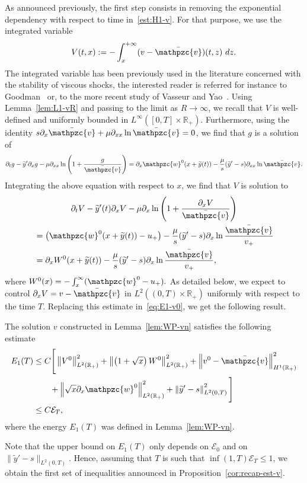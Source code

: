 \documentclass[AHL,Unicode,longabstracts,published]{cedram}
\newcommand{\R}{\mathbb{R}}
\newcommand{\p}{\partial}
\newcommand{\bv}{\bar{\mathpzc{v}}}
\newcommand{\cE}{\mathcal E}
\newcommand{\tw}{\mathpzc{w}}
\newcommand{\ty}{\widetilde{y}}
\begin{document}
As announced previously, the first step consists in removing the exponential dependency with respect to time in~\eqref{est:H1-v}. For that purpose, we use the integrated variable
\begin{equation}\label{df:V}
V(t,x) := -\int_x^{+\infty} (v - \bv)(t,z) \ dz.
\end{equation}
{The integrated variable has been previously used in the literature concerned with the stability of viscous shocks, the interested reader is referred for instance to Goodman~\cite{goodman1986} or, to the more recent study of Vasseur and Yao~\cite{vasseur2016}.} Using Lemma~\ref{lem:L1-vR} and passing to the limit as $R\to \infty$, we recall that $V$ is well-defined and uniformly bounded in $L^\infty([0,T]\times \R_+)$. Furthermore, using the identity $s\p_x \bv + \mu \p_{xx} \ln \bv=0 $, we find that $g$ is a solution of
\begin{equation}\label{eq:g}
\p_t g - \ty'\p_x g -\mu \p_{xx}\ln \left(1 + \frac{g}{\bv}\right)=\p_x \tw^0(x+\ty(t)) - \frac{\mu}{s}(\ty'-s)\p_{xx}\ln \bv.
\end{equation}
Integrating the above equation with respect to $x$, we find that $V$ is solution to
\begin{multline}\label{eq:V}
\partial_t V - \ty'(t) \partial_x V - \mu \partial_x \ln \left(1 + \dfrac{\partial_x V}{\bv} \right)\\
\begin{aligned}
& = \big(\tw^0(x + \ty(t)) - u_+ \big) - \dfrac{\mu}{s}(\ty'-s)\partial_x \ln \dfrac{\bv}{v_+}\\
&=\p_x W^0(x+\ty(t))- \dfrac{\mu}{s} (\ty'-s)\partial_x \ln \dfrac{\bv}{v_+},
\end{aligned}
\end{multline}
where $W^0(x)=-\int_x^\infty (\tw^0 - u_+).$ As detailed below, we expect to control $\partial_x V=v-\bv$ in $L^2((0,T)\times \R_+)$ uniformly with respect to the time $T$. Replacing this estimate in~\eqref{eq:E1-v0}, we get the following result.

\begin{lemm}\label{lem:L2-V}
The solution $v$ constructed in Lemma~\ref{lem:WP-vn} satisfies the following estimate
\begin{equation}\label{eq:est-H1-v}
\begin{split}
E_1(T) & \leq C \Bigg[\left\|V^{0}\right\|_{L^2(\R_+)}^2 +\left\|\left(1+\sqrt{x}\right) W^0\right\|_{L^2(\R_+)}^2+ \left\|v^0-\bv\right\|_{H^1(\R_+)}^2\\
& \qquad + \left\| \sqrt{x} \p_x \tw^0\right\|_{L^2(\R_+)}^2 + \left\|\ty'-s\right\|_{L^2(0,T)}^2 \Bigg]\\
& \leq C \cE_T,
\end{split}
\end{equation}
where the energy $E_1(T)$ was defined in Lemma~\ref{lem:WP-vn}.
\end{lemm} 
Note that the upper bound on $ E_1(T)$ only depends on $\cE_0$ and on $\|\ty'-s\|_{L^2(0,T)}$. Hence, assuming that $T$ is such that $\inf(1, T) \cE_T \leq 1$, we obtain the first set of inequalities announced in Proposition~\ref{cor:recap-est-v}.
\end{document}
